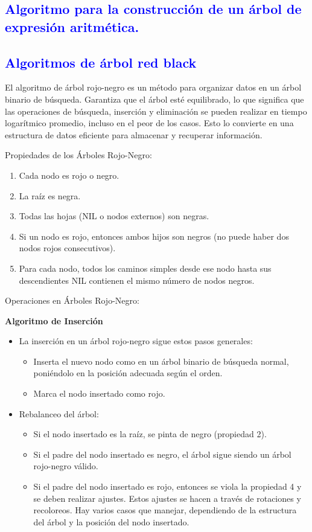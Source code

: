 \documentclass[12pt]{article}
\begin{document}
\subsection*{\textcolor{blue}{Algoritmo para la construcción de un árbol de expresión aritmética. }}

\subsection*{\textcolor{blue}{Algoritmos de árbol red black }}
El algoritmo de árbol rojo-negro es un método para organizar datos en un árbol binario de búsqueda. Garantiza que el árbol esté equilibrado, lo que significa que las operaciones de búsqueda, inserción y eliminación se pueden realizar en tiempo logarítmico promedio, incluso en el peor de los casos. Esto lo convierte en una estructura de datos eficiente para almacenar y recuperar información.
\par\vspace{0.4cm}
Propiedades de los Árboles Rojo-Negro:
\begin{enumerate}
    \item Cada nodo es rojo o negro.
    \item La raíz es negra.
    \item Todas las hojas (NIL o nodos externos) son negras.
    \item Si un nodo es rojo, entonces ambos hijos son negros (no puede haber dos nodos rojos consecutivos).
    \item Para cada nodo, todos los caminos simples desde ese nodo hasta sus descendientes NIL contienen el mismo número de nodos negros.
\end{enumerate}
Operaciones en Árboles Rojo-Negro:
\par\vspace{0.4cm}
\textbf{Algoritmo de Inserción}
\begin{itemize}
    \item La inserción en un árbol rojo-negro sigue estos pasos generales:
    \begin{itemize}
        \item Inserta el nuevo nodo como en un árbol binario de búsqueda normal, poniéndolo en la posición adecuada según el orden.
        \item Marca el nodo insertado como rojo.
    \end{itemize}
    \item Rebalanceo del árbol:
    \begin{itemize}
        \item Si el nodo insertado es la raíz, se pinta de negro (propiedad 2).
        \item Si el padre del nodo insertado es negro, el árbol sigue siendo un árbol rojo-negro válido.
        \item Si el padre del nodo insertado es rojo, entonces se viola la propiedad 4 y se deben realizar ajustes. Estos ajustes se hacen a través de rotaciones y recoloreos. Hay varios casos que manejar, dependiendo de la estructura del árbol y la posición del nodo insertado.
    \end{itemize}
\end{itemize}
\end{document}
